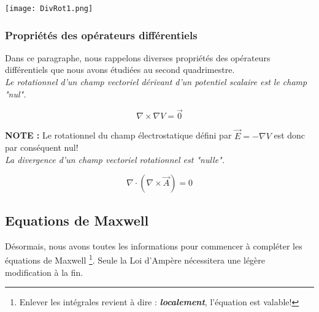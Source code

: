 \documentclass[a4paper,12pt]{article}
\begin{document}
\begin{center}
\texttt{[image: DivRot1.png]}
\end{center}

\newpage

\subsubsection{Propriétés des opérateurs différentiels}

Dans ce paragraphe, nous rappelons diverses propriétés des opérateurs différentiels que nous avons étudiées au second quadrimestre. 
\\  

\textit{Le rotationnel d'un champ vectoriel dérivant d'un potentiel scalaire est le champ "nul".} 

\[\nabla \times \nabla V = \vec{0} \] 

\textbf{NOTE : } Le rotationnel du champ électrostatique défini par $\vec{E} = -\nabla V$ est donc par conséquent nul!  \\ 

\textit{La divergence d'un champ vectoriel rotationnel est  "nulle".}  

\[\nabla \cdot (\nabla \times \vec{A})  = 0 \]

\subsection{Equations de Maxwell}
Désormais, nous avons toutes les informations pour commencer à compléter les équations de Maxwell \footnote{Enlever les intégrales revient à dire : \textit{\textbf{localement}}, l'équation est valable!}. 
Seule la Loi d'Ampère nécessitera une légère modification à la fin. \\
\end{document}
